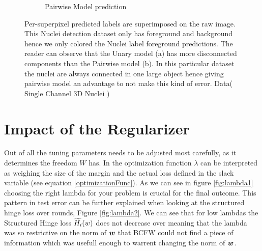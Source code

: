 \begin{figure}
\begin{subfigure}{.5\textwidth}
  \caption{Pairwise Model prediction}
  \label{fig:smoothNucliePair}
\end{subfigure}
\caption{ Per-superpixel predicted labels are superimposed on the raw image. This Nuclei detection dataset only has foreground and background hence we only colored the Nuclei label foreground predictions. The reader can observe that the Unary model (a) has more disconnected components than the Pairwise model (b). In this particular dataset the nuclei are always connected in one large object hence giving pairwise model an advantage to not make this kind of error. Data( Single Channel 3D Nuclei \cite{ucsbData}) }
\label{fig:smoothNuclie}
\end{figure}
\section{Impact of the Regularizer }\label{sec:Lambda}
Out of all the tuning parameters  needs to be adjusted most carefully, as it determines the freedom $W$ has. In the optimization function $\lambda$ can be interpreted as weighing the size of the margin and the actual loss defined in the slack variable (see equation \vref{optimizationFunc}). As we can see in figure \ref{fig:lambda1} choosing the right lambda for your problem is crucial for the final outcome. This pattern in test error can be further explained when looking at the structured hinge loss over rounds, Figure \ref{fig:lambda2}. We can see that for low lambdas the Structured Hinge loss $\widetilde{H_i}(w)$ does not decrease over meaning that the lambda was so restrictive on the norm of $\bm{w}$ that BCFW could not find a piece of information which was usefull enough to warrent changing the norm of $\bm{w}$. 

